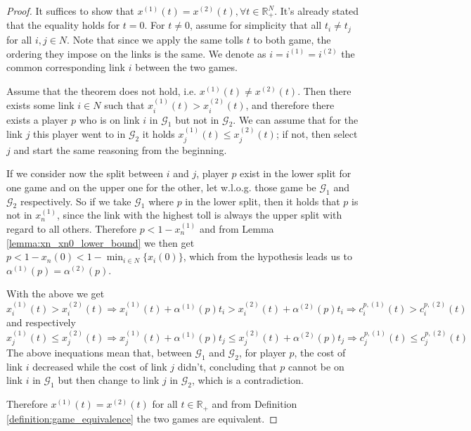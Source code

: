 \documentclass[10pt,a4paper]{book}
\newcommand{\R}{\mathbb{R}}
\newcommand{\Gm}{\mathcal{G}}
\theoremstyle{definition}
\theoremstyle{comment}
\begin{document}
\begin{proof}
	It suffices to show that $x^{(1)}(t) = x^{(2)}(t), \forall t \in \R_+^N$.
	It's already stated that the equality holds for $t = 0$.
	For $t \ne 0$, assume for simplicity that all $t_i \ne t_j$ for all $i, j \in N$.
	Note that since we apply the same tolls $t$ to both game, the ordering they impose on the links is the same.
	We denote as $i = i^{(1)} = i^{(2)}$ the common corresponding link $i$ between the two games.

	Assume that the theorem does not hold, i.e. $x^{(1)}(t) \ne x^{(2)}(t)$.
	Then there exists some link $i \in N$ such that $x_i^{(1)}(t) > x_i^{(2)}(t)$, and therefore there exists a player $p$ who is on link $i$ in $\Gm_1$ but not in $\Gm_2$.
	We can assume that for the link $j$ this player went to in $\Gm_2$ it holds $x_j^{(1)}(t) \le x_j^{(2)}(t)$; if not, then select $j$ and start the same reasoning from the beginning.

	If we consider now the split between $i$ and $j$, player $p$ exist in the lower split for one game and on the upper one for the other, let w.l.o.g. those game be $\Gm_1$ and $\Gm_2$ respectively.
	So if we take $\Gm_1$ where $p$ in the lower split, then it holds that $p$ is not in $x_n^{(1)}$, since the link with the highest toll is always the upper split with regard to all others.
	Therefore $p < 1 - x_n^{(1)}$ and from Lemma \ref{lemma:xn_xn0_lower_bound} we then get $p < 1 - x_n(0) < 1 - \min_{i \in N}\{x_i(0)\}$, which from the hypothesis leads us to $\alpha^{(1)}(p) = \alpha^{(2)}(p)$.

	With the above we get
	\[x_i^{(1)}(t) > x_i^{(2)}(t) \Rightarrow x_i^{(1)}(t) + \alpha^{(1)}(p)t_i > x_i^{(2)}(t) + \alpha^{(2)}(p)t_i \Rightarrow c_i^{p, (1)}(t) > c_i^{p, (2)}(t)\]
	and respectively
	\[x_j^{(1)}(t) \le x_j^{(2)}(t) \Rightarrow x_j^{(1)}(t) + \alpha^{(1)}(p)t_j \le x_j^{(2)}(t) + \alpha^{(2)}(p)t_j \Rightarrow c_j^{p, (1)}(t) \le c_j^{p, (2)}(t)\]
	The above inequations mean that, between $\Gm_1$ and $\Gm_2$, for player $p$, the cost of link $i$ decreased while the cost of link $j$ didn't, concluding that $p$ cannot be on link $i$ in $\Gm_1$ but then change to link $j$ in $\Gm_2$, which is a contradiction.

	Therefore $x^{(1)}(t) = x^{(2)}(t)$ for all $t \in \R_+$ and from Definition \ref{definition:game_equivalence} the two games are equivalent.
\end{proof}
\end{document}
